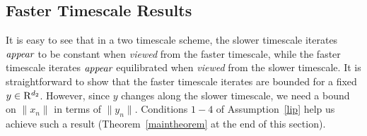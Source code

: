 \subsection{Faster Timescale Results}\label{faster}
It is easy to see that in a two timescale scheme, the slower timescale iterates $\emph{appear}$ 
to be constant when {\em viewed} from the faster timescale, while the faster timescale iterates 
$\emph{appear}$ equilibrated when {\em viewed} from the slower timescale. It is straightforward to show 
that the faster timescale iterates are bounded for a fixed $y \in \mathrm{R}^{d_2}$. However, since $y$ changes 
along the slower timescale, we need a bound on $\parallel x_n\parallel$ in terms of 
$\parallel y_n\parallel$. Conditions $1-4$ of Assumption~\ref{lip} help us achieve such a result (Theorem~\ref{maintheorem} at the end of this section).

